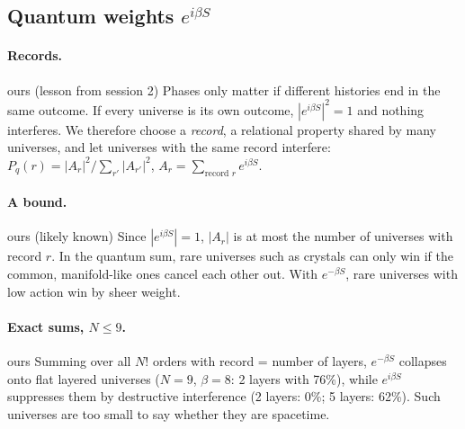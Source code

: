 \documentclass[11pt,a4paper]{article}
\newcommand{\tagbox}[2]{\textsf{\scriptsize\colorbox{#1!12}{\textcolor{#1!70!black}{#2}}}}
\newcommand{\ours}{\tagbox{orange}{ours}}
\begin{document}
\subsection{Quantum weights $e^{i\beta S}$}
\paragraph{Records.} \ours{} (lesson from session 2) Phases only matter if different histories end in the same outcome. If every universe is its own outcome, $|e^{i\beta S}|^2=1$ and nothing interferes. We therefore choose a \emph{record}, a relational property shared by many universes, and let universes with the same record interfere: $P_q(r)=|A_r|^2/\sum_{r'}|A_{r'}|^2$, $A_r=\sum_{\text{record }r}e^{i\beta S}$.

\paragraph{A bound.} \ours{} (likely known) Since $|e^{i\beta S}|=1$, $|A_r|$ is at most the number of universes with record $r$. In the quantum sum, rare universes such as crystals can only win if the common, manifold-like ones cancel each other out. With $e^{-\beta S}$, rare universes with low action win by sheer weight.

\paragraph{Exact sums, $N\le9$.} \ours{} Summing over all $N!$ orders with record = number of layers, $e^{-\beta S}$ collapses onto flat layered universes ($N=9$, $\beta=8$: 2 layers with 76\%), while $e^{i\beta S}$ suppresses them by destructive interference (2 layers: 0\%; 5 layers: 62\%). Such universes are too small to say whether they are spacetime.
\end{document}

